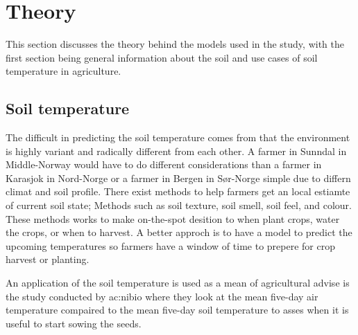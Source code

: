 \section{Theory}\label{sec:theory}

This section discusses the theory behind the models used in the study, with the first section being general information about the soil and use cases of soil temperature in agriculture.

\subsection{Soil temperature}
The difficult in predicting the soil temperature comes from that the environment is highly variant and radically different from each other. A farmer in Sunndal in Middle-Norway would have to do different considerations than a farmer in Karasjok in Nord-Norge or a farmer in Bergen in Sør-Norge simple due to differn climat and soil profile. There exist methods to help farmers get an local estiamte of current soil state; Methods such as soil texture, soil smell, soil feel, and colour. These methods works to make on-the-spot desition to when plant crops, water the crops, or when to harvest. A better approch is to have a model to predict the upcoming temperatures so farmers have a window of time to prepere for crop harvest or planting. 

An application of the soil temperature is used as a mean of agricultural advise is the study conducted by \acrshort{ac:nibio} where they look at the mean five-day air temperature compaired to the mean five-day soil temperature to asses when it is useful to start sowing the seeds\cite{nordskog_jordtemperatur_2018}. 

